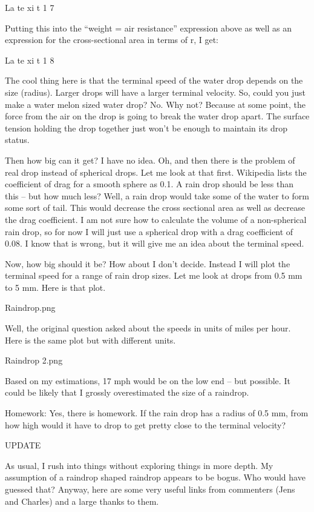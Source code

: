 La te xi t 1 7

Putting this into the “weight = air resistance” expression above as well as an expression for the cross-sectional area in terms of r, I get:

La te xi t 1 8

The cool thing here is that the terminal speed of the water drop depends on the size (radius). Larger drops will have a larger terminal velocity. So, could you just make a water melon sized water drop? No. Why not? Because at some point, the force from the air on the drop is going to break the water drop apart. The surface tension holding the drop together just won’t be enough to maintain its drop status.

Then how big can it get? I have no idea. Oh, and then there is the problem of real drop instead of spherical drops. Let me look at that first. Wikipedia lists the coefficient of drag for a smooth sphere as 0.1. A rain drop should be less than this – but how much less? Well, a rain drop would take some of the water to form some sort of tail. This would decrease the cross sectional area as well as decrease the drag coefficient. I am not sure how to calculate the volume of a non-spherical rain drop, so for now I will just use a spherical drop with a drag coefficient of 0.08. I know that is wrong, but it will give me an idea about the terminal speed.

Now, how big should it be? How about I don’t decide. Instead I will plot the terminal speed for a range of rain drop sizes. Let me look at drops from 0.5 mm to 5 mm. Here is that plot.

Raindrop.png

Well, the original question asked about the speeds in units of miles per hour. Here is the same plot but with different units.

Raindrop 2.png

Based on my estimations, 17 mph would be on the low end – but possible. It could be likely that I grossly overestimated the size of a raindrop.

Homework: Yes, there is homework. If the rain drop has a radius of 0.5 mm, from how high would it have to drop to get pretty close to the terminal velocity?


UPDATE


As usual, I rush into things without exploring things in more depth. My assumption of a raindrop shaped raindrop appears to be bogus. Who would have guessed that? Anyway, here are some very useful links from commenters (Jens and Charles) and a large thanks to them.

